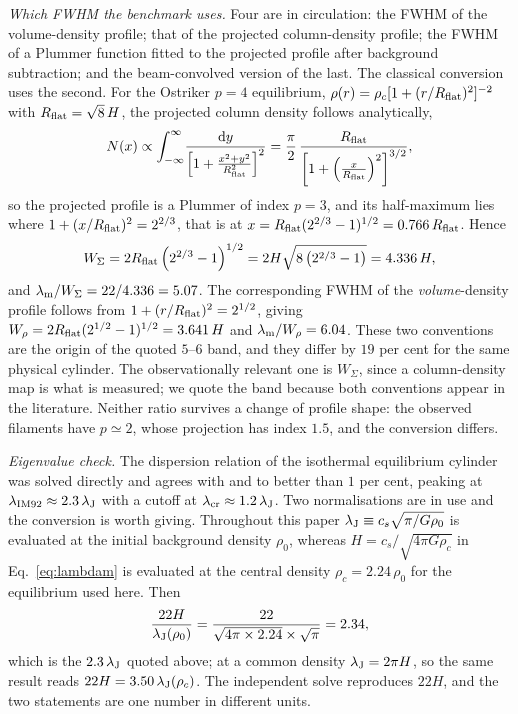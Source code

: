 \documentclass[usenatbib,twoside,twocolumn]{mnras}
\begin{document}
\emph{Which FWHM the benchmark uses.} Four are in circulation: the FWHM of the volume-density profile; that of the projected column-density profile; the FWHM of a Plummer function fitted to the projected profile after background subtraction; and the beam-convolved version of the last. The classical conversion uses the second. For the Ostriker $p=4$ equilibrium, $\rho(r)=\rho_c[1+(r/R_{\rm flat})^2]^{-2}$ with $R_{\rm flat}=\sqrt8\,H$, the projected column density follows analytically,
\begin{equation}
N(x)\propto\int_{-\infty}^{\infty}\!\frac{{\rm d}y}{\left[1+\frac{x^2+y^2}{R_{\rm flat}^2}\right]^{2}}
=\frac{\pi}{2}\,\frac{R_{\rm flat}}{\left[1+\left(\frac{x}{R_{\rm flat}}\right)^{2}\right]^{3/2}},
\label{eq:ostrikercol}
\end{equation}
so the projected profile is a Plummer of index $p=3$, and its half-maximum lies where $1+(x/R_{\rm flat})^{2}=2^{2/3}$, that is at $x=R_{\rm flat}(2^{2/3}-1)^{1/2}=0.766\,R_{\rm flat}$. Hence
\begin{equation}
W_{\Sigma}=2R_{\rm flat}\left(2^{2/3}-1\right)^{1/2}=2H\sqrt{8\left(2^{2/3}-1\right)}=4.336\,H,
\label{eq:wsigma}
\end{equation}
and $\lambda_{\rm m}/W_{\Sigma}=22/4.336=5.07$. The corresponding FWHM of the \emph{volume}-density profile follows from $1+(r/R_{\rm flat})^{2}=2^{1/2}$, giving $W_{\rho}=2R_{\rm flat}(2^{1/2}-1)^{1/2}=3.641\,H$ and $\lambda_{\rm m}/W_{\rho}=6.04$. These two conventions are the origin of the quoted $5$--$6$ band, and they differ by $19$ per cent for the same physical cylinder. The observationally relevant one is $W_{\Sigma}$, since a column-density map is what is measured; we quote the band because both conventions appear in the literature. Neither ratio survives a change of profile shape: the observed filaments have $p\simeq2$, whose projection has index $1.5$, and the conversion differs.

\emph{Eigenvalue check.} The dispersion relation of the isothermal equilibrium cylinder was solved directly and agrees with \citet{Nagasawa1987} and \citet{Fischera2012} to better than $1$ per cent, peaking at $\lambda_{\rm IM92}\approx2.3\,\lambda_{\rm J}$ with a cutoff at $\lambda_{\rm cr}\approx1.2\,\lambda_{\rm J}$. Two normalisations are in use and the conversion is worth giving. Throughout this paper $\lambda_{\rm J}\equiv c_s\sqrt{\pi/G\rho_0}$ is evaluated at the initial background density $\rho_0$, whereas $H=c_s/\sqrt{4\pi G\rho_c}$ in Eq.~\ref{eq:lambdam} is evaluated at the central density $\rho_c=2.24\,\rho_0$ for the equilibrium used here. Then
\begin{equation}
\frac{22H}{\lambda_{\rm J}(\rho_0)}=\frac{22}{\sqrt{4\pi\times2.24}\times\sqrt{\pi}}=2.34,
\label{eq:hconv}
\end{equation}
which is the $2.3\,\lambda_{\rm J}$ quoted above; at a common density $\lambda_{\rm J}=2\pi H$, so the same result reads $22H=3.50\,\lambda_{\rm J}(\rho_c)$. The independent solve reproduces $22H$, and the two statements are one number in different units.
\end{document}
